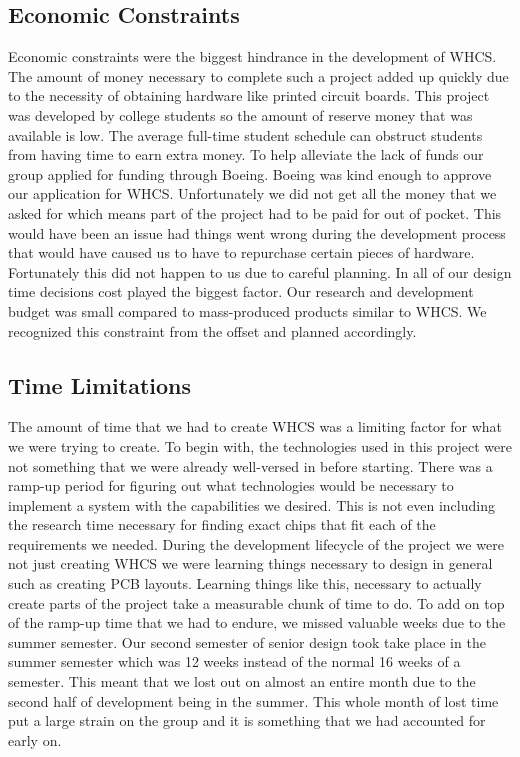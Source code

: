 
\subsection{Economic Constraints}
Economic constraints were the biggest hindrance in the development of WHCS. The
amount of money necessary to complete such a project added up quickly due to the
necessity of obtaining hardware like printed circuit boards. This project was
developed by college students so the amount of reserve money that was
available is low. The average full{}-time student schedule can obstruct
students from having time to earn extra money. To help alleviate the lack of
funds our group applied for funding through Boeing. Boeing was kind enough to
approve our application for WHCS. Unfortunately we did not get all the money
that we asked for which means part of the project had to be paid for out
of pocket.  This would have been an issue had things went wrong during the
development process that would have caused us to have to repurchase certain pieces of
hardware. Fortunately this did not happen to us due to careful planning. In all of our design time decisions cost played the biggest factor.
Our research and development budget was small compared to mass{}-produced
products similar to WHCS. We recognized this constraint from the offset
and planned accordingly.

\subsection{Time Limitations}
The amount of time that we had to create WHCS was a limiting factor for what we were trying to create. To begin with, the technologies used in this project were
not something that we were already well{}-versed in before starting. There was
a ramp{}-up period for figuring out what technologies would be necessary to
implement a system with the capabilities we desired. This is not even including
the research time necessary for finding exact chips that fit each of the
requirements we needed. During the development lifecycle of the project we were
not just creating WHCS we were learning things necessary to design in general
such as creating PCB layouts. Learning things like this, necessary to actually
create parts of the project take a measurable chunk of time to do. To add on
top of the ramp{}-up time that we had to endure, we missed valuable
weeks due to the summer semester. Our second semester of senior design took
take place in the summer semester which was 12 weeks instead of the normal 16
weeks of a semester. This meant that we lost out on almost an entire month due
to the second half of development being in the summer. This whole month of lost
time put a large strain on the group and it is something that we had
accounted for early on.

